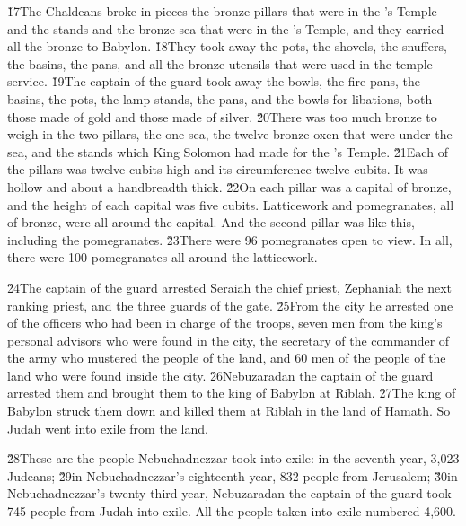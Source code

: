 \v{17}The Chaldeans broke in pieces the bronze pillars that were in the 's Temple and the stands and the bronze sea that were in the 's Temple, and they carried all the bronze to Babylon. \v{18}They took away the pots, the shovels, the snuffers, the basins, the pans, and all the bronze utensils that were used in the temple service. \v{19}The captain of the guard took away the bowls, the fire pans, the basins, the pots, the lamp stands, the pans, and the bowls for libations, both those made of gold and those made of silver. \v{20}There was too much bronze to weigh in the two pillars, the one sea, the twelve bronze oxen that were under the sea, and the stands which King Solomon had made for the 's Temple. \v{21}Each of the pillars was twelve cubits high and its circumference twelve cubits. It was hollow and about a handbreadth thick. \v{22}On each pillar was a capital of bronze, and the height of each capital was five cubits. Latticework and pomegranates, all of bronze, were all around the capital. And the second pillar was like this, including the pomegranates. \v{23}There were 96 pomegranates open to view. In all, there were 100 pomegranates all around the latticework.

\v{24}The captain of the guard arrested Seraiah the chief priest, Zephaniah the next ranking priest, and the three guards of the gate. \v{25}From the city he arrested one of the officers who had been in charge of the troops, seven men from the king's personal advisors who were found in the city, the secretary of the commander of the army who mustered the people of the land, and 60 men of the people of the land who were found inside the city. \v{26}Nebuzaradan the captain of the guard arrested them and brought them to the king of Babylon at Riblah. \v{27}The king of Babylon struck them down and killed them at Riblah in the land of Hamath. So Judah went into exile from the land.

\v{28}These are the people Nebuchadnezzar took into exile: in the seventh year, 3,023 Judeans; \v{29}in Nebuchadnezzar's eighteenth year, 832 people from Jerusalem; \v{30}in Nebuchadnezzar's twenty-third year, Nebuzaradan the captain of the guard took 745 people from Judah into exile. All the people taken into exile numbered 4,600.

